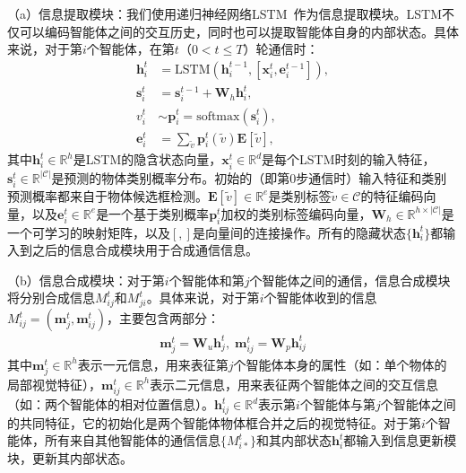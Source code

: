（a）信息提取模块：我们使用递归神经网络LSTM~\cite{hochreiter1997long}作为信息提取模块。LSTM不仅可以编码智能体之间的交互历史，同时也可以提取智能体自身的内部状态。具体来说，对于第$i$个智能体，在第$t$（$0 < t \leqslant T$）轮通信时：
\begin{equation}
\begin{aligned}
    \bm{h}^{t}_i & = \text{LSTM}(\bm{h}^{t-1}_i, [\bm{x}^{t}_i, \bm{e}^{t-1}_i]), \\
    \bm{s}^t_i & = \bm{s}^{t-1}_i + \bm{W}_h \bm{h}^{t}_i, \\
    v^t_i & \sim \bm{p}^{t}_i = \text{softmax}(\bm{s}^t_i), \\
    \bm{e}^{t}_i &= \textstyle{\sum_{\tilde{v}}} \bm{p}^{t}_i(\tilde{v}) \mathbf{E}[\tilde{v}],
\end{aligned}
\end{equation}
其中$\bm{h}^t_i \in \mathbb{R}^h$是LSTM的隐含状态向量，$\bm{x}^t_i \in \mathbb{R}^d$是每个LSTM时刻的输入特征，$\bm{s}^t_i \in \mathbb{R}^{|\mathcal{C}|}$是预测的物体类别概率分布。初始的（即第0步通信时）输入特征和类别预测概率都来自于物体候选框检测。$\mathbf{E}[\tilde{v}] \in \mathbb{R}^e$是类别标签$\tilde{v} \in \mathcal{C}$的特征编码向量，以及$\bm{e}^{t}_i \in \mathbb{R}^e$是一个基于类别概率$\bm{p}^t_i$加权的类别标签编码向量，$\bm{W}_h \in \mathbb{R}^{h \times |\mathcal{C}|}$是一个可学习的映射矩阵，以及$[,]$是向量间的连接操作。所有的隐藏状态$\{\bm{h}^t_i\}$都输入到之后的信息合成模块用于合成通信信息。


（b）信息合成模块：对于第$i$个智能体和第$j$个智能体之间的通信，信息合成模块将分别合成信息$M^t_{ij}$和$M^t_{ji}$。具体来说，对于第$i$个智能体收到的信息$M^t_{ij} = (\bm{m}^t_j, \bm{m}^t_{ij})$，主要包含两部分：
\begin{equation}
\begin{aligned}
\bm{m}^t_j = \bm{W}_u \bm{h}^t_j, \; \bm{m}^t_{ij} = \bm{W}_p\bm{h}^t_{ij}
\end{aligned}
\end{equation}
其中$\bm{m}^t_j \in \mathbb{R}^h$表示一元信息，用来表征第$j$个智能体本身的属性（如：单个物体的局部视觉特征），$\bm{m}^t_{ij} \in \mathbb{R}^h$表示二元信息，用来表征两个智能体之间的交互信息（如：两个智能体的相对位置信息）。$\bm{h}^t_{ij} \in \mathbb{R}^d$表示第$i$个智能体与第$j$个智能体之间的共同特征，它的初始化是两个智能体物体框合并之后的视觉特征。对于第$i$个智能体，所有来自其他智能体的通信信息$\{M^t_{i*}\}$和其内部状态$\bm{h}^t_i$都输入到信息更新模块，更新其内部状态。

